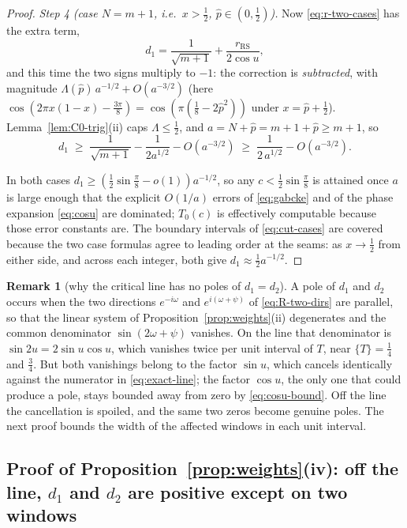 \documentclass[11pt]{article}
\theoremstyle{definition}
\newtheorem{remark}[theorem]{Remark}
\begin{document}
\begin{proof}
\emph{Step 4 (case $N=m+1$, i.e.\ $x>\tfrac12$,
$\hat p\in(0,\tfrac12)$).} Now \eqref{eq:r-two-cases} has the extra term,
\[
d_1=\frac1{\sqrt{m+1}}+\frac{r_{\mathrm{RS}}}{2\cos u},
\]
and this time the two signs multiply to $-1$: the correction is
\emph{subtracted}, with magnitude $\Lambda(\hat p)\,a^{-1/2}+O(a^{-3/2})$
(here $\cos(2\pi x(1-x)-\tfrac{3\pi}8)=\cos(\pi(\tfrac18-2\hat p^{2}))$
under $x=\hat p+\tfrac12$). Lemma~\ref{lem:C0-trig}(ii) caps
$\Lambda\leq\tfrac12$, and $a=N+\hat p=m+1+\hat p\geq m+1$, so
\[
d_1\;\geq\;\frac1{\sqrt{m+1}}-\frac{1}{2a^{1/2}}-O(a^{-3/2})
\;\geq\;\frac{1}{2\,a^{1/2}}-O(a^{-3/2}).
\]

In both cases $d_1\geq(\tfrac12\sin\tfrac\pi8-o(1))a^{-1/2}$, so any
$c<\tfrac12\sin\tfrac\pi8$ is attained once $a$ is large enough that the
explicit $O(1/a)$ errors of \eqref{eq:gabcke} and of the phase expansion
\eqref{eq:cosu} are dominated; $T_0(c)$ is effectively computable because
those error constants are. The boundary intervals of
\eqref{eq:cut-cases} are covered because the two case formulas agree to
leading order at the seams: as $x\to\tfrac12$ from either side, and across
each integer, both give $d_1\approx\tfrac12a^{-1/2}$.
\end{proof}

\begin{remark}[why the critical line has no poles of $d_1=d_2$]
A pole of $d_1$ and $d_2$ occurs when the two directions $e^{-i\omega}$
and $e^{i(\omega+\psi)}$ of \eqref{eq:R-two-dirs} are parallel, so that the
linear system of Proposition~\ref{prop:weights}(ii) degenerates and the
common denominator $\sin(2\omega+\psi)$ vanishes. On the line that
denominator is $\sin2u=2\sin u\cos u$, which vanishes twice per unit
interval of $T$, near $\{T\}=\tfrac14$ and $\tfrac34$. But both vanishings
belong to the factor $\sin u$, which cancels identically against the
numerator in \eqref{eq:exact-line}; the factor $\cos u$, the only one
that could produce a pole, stays bounded away from zero by
\eqref{eq:cosu-bound}. Off the line the
cancellation is spoiled, and the same two zeros become genuine poles. The
next proof bounds the width of the affected windows in each unit interval.
\end{remark}

\subsection{Proof of Proposition~\ref{prop:weights}(iv): off the line, \texorpdfstring{$d_1$ and $d_2$}{d1 and d2} are positive except on two windows}\label{sec:proof-iv}
\end{document}
